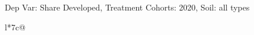 \begin{table}[H]
\captionlistentry[table]{}
\label{table:beaver_land_class_DVis_land_class_3_SCg3_SSall_soil}
\scriptsize %
Dep Var: Share Developed, Treatment Cohorts: 2020, Soil: all types \\
\begin{threeparttable}
\begin{tabulary}{\textwidth}{l*{7}{c}@{}}
\toprule \toprule
\noalign{\smallskip}
\noalign{\smallskip}
\midrule \bottomrule
\end{tabulary}
\medskip
\end{threeparttable}
\end{table}
